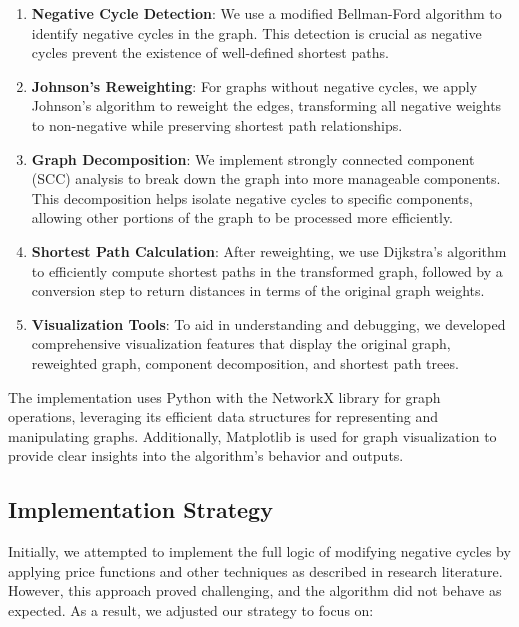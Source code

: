 \documentclass[11pt]{article}
\begin{document}
\begin{enumerate}
    \item \textbf{Negative Cycle Detection}: We use a modified Bellman-Ford algorithm to identify negative cycles in the graph. This detection is crucial as negative cycles prevent the existence of well-defined shortest paths.
    
    \item \textbf{Johnson's Reweighting}: For graphs without negative cycles, we apply Johnson's algorithm to reweight the edges, transforming all negative weights to non-negative while preserving shortest path relationships.
    
    \item \textbf{Graph Decomposition}: We implement strongly connected component (SCC) analysis to break down the graph into more manageable components. This decomposition helps isolate negative cycles to specific components, allowing other portions of the graph to be processed more efficiently.
    
    \item \textbf{Shortest Path Calculation}: After reweighting, we use Dijkstra's algorithm to efficiently compute shortest paths in the transformed graph, followed by a conversion step to return distances in terms of the original graph weights.
    
    \item \textbf{Visualization Tools}: To aid in understanding and debugging, we developed comprehensive visualization features that display the original graph, reweighted graph, component decomposition, and shortest path trees.
\end{enumerate}

The implementation uses Python with the NetworkX library for graph operations, leveraging its efficient data structures for representing and manipulating graphs. Additionally, Matplotlib is used for graph visualization to provide clear insights into the algorithm's behavior and outputs.

\subsection{Implementation Strategy}

Initially, we attempted to implement the full logic of modifying negative cycles by applying price functions and other techniques as described in research literature. However, this approach proved challenging, and the algorithm did not behave as expected. As a result, we adjusted our strategy to focus on:
\end{document}
